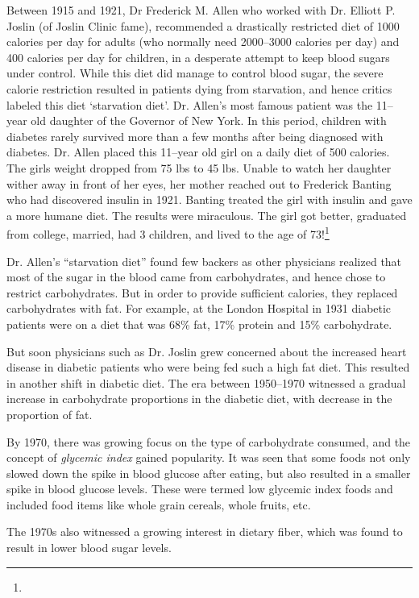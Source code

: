 Between 1915 and 1921, Dr Frederick M. Allen who worked with Dr. Elliott P. Joslin (of Joslin Clinic fame), recommended a drastically restricted diet of 1000 calories per day for adults (who normally need 2000–3000 calories per day) and 400 calories per day for children, in a desperate attempt to keep blood sugars under control. While this diet did manage to control blood sugar, the severe calorie restriction resulted in patients dying from starvation, and hence critics labeled this diet ‘starvation diet’. Dr. Allen’s most famous patient was the 11–year old daughter of the Governor of New York. In this period, children with diabetes rarely survived more than a few months after being diagnosed with diabetes. Dr. Allen placed this 11–year old girl on a daily diet of 500 calories. The girls weight dropped from 75 lbs to 45 lbs. Unable to watch her daughter wither away in front of her eyes, her mother reached out to Frederick Banting who had discovered insulin in 1921. Banting treated the girl with insulin and gave a more humane diet. The results were miraculous. The girl got better, graduated from college, married, had 3 children, and lived to the age of 73!\footnote{}

Dr. Allen’s “starvation diet” found few backers as other physicians realized that most of the sugar in the blood came from carbohydrates, and hence chose to restrict carbohydrates. But in order to provide sufficient calories, they replaced carbohydrates with fat. For example, at the London Hospital in 1931 diabetic patients were on a diet that was 68\% fat, 17\% protein and 15\% carbohydrate.

But soon physicians such as Dr. Joslin grew concerned about the increased heart disease in diabetic patients who were being fed such a high fat diet. This resulted in another shift in diabetic diet. The era between 1950–1970 witnessed a gradual increase in carbohydrate proportions in the diabetic diet, with decrease in the proportion of fat.

By 1970, there was growing focus on the type of carbohydrate consumed, and the concept of \textit{glycemic index} gained popularity. It was seen that some foods not only slowed down the spike in blood glucose after eating, but also resulted in a smaller spike in blood glucose levels. These were termed low glycemic index foods and included food items like whole grain cereals, whole fruits, etc.

The 1970s also witnessed a growing interest in dietary fiber, which was found to result in lower blood sugar levels.

